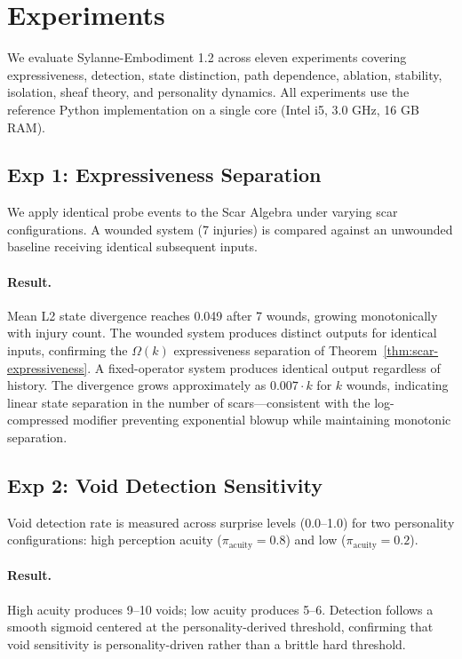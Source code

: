 \documentclass[11pt]{article}
\begin{document}
\section{Experiments}
\label{sec:experiments}

We evaluate Sylanne-Embodiment 1.2 across eleven experiments covering expressiveness, detection, state distinction, path dependence, ablation, stability, isolation, sheaf theory, and personality dynamics. All experiments use the reference Python implementation on a single core (Intel i5, 3.0 GHz, 16 GB RAM).

\subsection{Exp 1: Expressiveness Separation}

We apply identical probe events to the Scar Algebra under varying scar configurations. A wounded system (7 injuries) is compared against an unwounded baseline receiving identical subsequent inputs.

\paragraph{Result.} Mean L2 state divergence reaches 0.049 after 7 wounds, growing monotonically with injury count. The wounded system produces distinct outputs for identical inputs, confirming the $\Omega(k)$ expressiveness separation of Theorem~\ref{thm:scar-expressiveness}. A fixed-operator system produces identical output regardless of history. The divergence grows approximately as $0.007 \cdot k$ for $k$ wounds, indicating linear state separation in the number of scars---consistent with the log-compressed modifier preventing exponential blowup while maintaining monotonic separation.

\subsection{Exp 2: Void Detection Sensitivity}

Void detection rate is measured across surprise levels (0.0--1.0) for two personality configurations: high perception acuity ($\pi_{\text{acuity}} = 0.8$) and low ($\pi_{\text{acuity}} = 0.2$).

\paragraph{Result.} High acuity produces 9--10 voids; low acuity produces 5--6. Detection follows a smooth sigmoid centered at the personality-derived threshold, confirming that void sensitivity is personality-driven rather than a brittle hard threshold.
\end{document}
